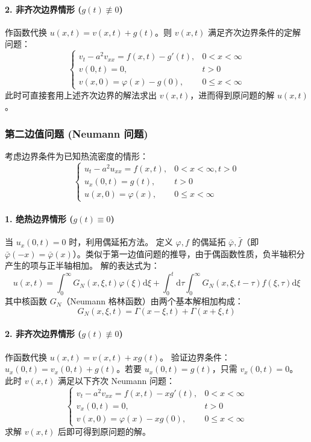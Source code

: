 \documentclass[12pt,a4paper]{ctexart}
\begin{document}
	\paragraph{2. 非齐次边界情形 ($g(t) \not\equiv 0$)}
	作函数代换 $u(x,t) = v(x,t) + g(t)$。则 $v(x,t)$ 满足齐次边界条件的定解问题：
	\[
	\begin{cases}
		v_t - a^2 v_{xx} = f(x,t) - g'(t), & 0 < x < \infty \\
		v(0,t) = 0, & t > 0 \\
		v(x,0) = \varphi(x) - g(0), & 0 \leqslant x < \infty
	\end{cases}
	\]
	此时可直接套用上述齐次边界的解法求出 $v(x,t)$，进而得到原问题的解 $u(x,t)$。
	
	\subsubsection{第二边值问题 (Neumann 问题)}
	
	考虑边界条件为已知热流密度的情形：
	\begin{equation}
		\begin{cases}
			u_t - a^2 u_{xx} = f(x,t), & 0 < x < \infty, t > 0 \\
			u_x(0,t) = g(t), & t > 0 \\
			u(x,0) = \varphi(x), & 0 \leqslant x < \infty
		\end{cases}
	\end{equation}
	
	\paragraph{1. 绝热边界情形 ($g(t) \equiv 0$)}
	当 $u_x(0,t) = 0$ 时，利用偶延拓方法。
	定义 $\varphi, f$ 的偶延拓 $\bar{\varphi}, \bar{f}$（即 $\bar{\varphi}(-x) = \bar{\varphi}(x)$）。类似于第一边值问题的推导，由于偶函数性质，负半轴积分产生的项与正半轴相加。
	解的表达式为：
	\begin{equation}
		u(x,t) = \int_{0}^{\infty} G_N(x, \xi, t) \varphi(\xi) \mathrm{d}\xi + \int_0^t \mathrm{d}\tau \int_{0}^{\infty} G_N(x, \xi, t-\tau) f(\xi, \tau) \mathrm{d}\xi
	\end{equation}
	其中核函数 $G_N$（Neumann 格林函数）由两个基本解相加构成：
	\begin{equation}
		G_N(x, \xi, t) = \Gamma(x-\xi, t) + \Gamma(x+\xi, t)
	\end{equation}
	
	\paragraph{2. 非齐次边界情形 ($g(t) \not\equiv 0$)}
	作函数代换 $u(x,t) = v(x,t) + xg(t)$。
	验证边界条件：$u_x(0,t) = v_x(0,t) + g(t)$。若要 $u_x(0,t) = g(t)$，只需 $v_x(0,t) = 0$。
	此时 $v(x,t)$ 满足以下齐次 Neumann 问题：
	\[
	\begin{cases}
		v_t - a^2 v_{xx} = f(x,t) - xg'(t), & 0 < x < \infty \\
		v_x(0,t) = 0, & t > 0 \\
		v(x,0) = \varphi(x) - xg(0), & 0 \leqslant x < \infty
	\end{cases}
	\]
	求解 $v(x,t)$ 后即可得到原问题的解。
	
\end{document}
